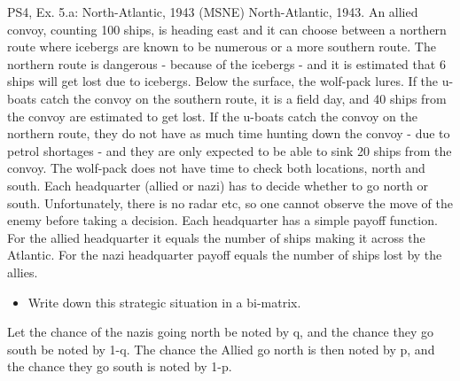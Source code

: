 \begin{frame}{PS4, Ex. 5.a: North-Atlantic, 1943 (MSNE)}
      North-Atlantic, 1943. An allied convoy, counting 100 ships, is heading east and it can choose between a northern route where icebergs are known to be numerous or a more southern route. The northern route is dangerous - because of the icebergs - and it is estimated that 6 ships will get lost due to icebergs. Below the surface, the wolf-pack lures. If the u-boats catch the convoy on the southern route, it is a field day, and 40 ships from the convoy are estimated to get lost. If the u-boats catch the convoy on the northern route, they do not have as much time hunting down the convoy - due to petrol shortages - and they are only expected to be able to sink 20 ships from the convoy. The wolf-pack does not have time to check both locations, north and south. Each headquarter (allied or nazi) has to decide whether to go north or south. Unfortunately, there is no radar etc, so one cannot observe the move of the enemy before taking a decision. Each headquarter has a simple payoff function. For the allied headquarter it equals the number of ships making it across the Atlantic. For the nazi headquarter payoff equals the number of ships lost by the allies.
    \begin{itemize}
      \item[(a)] Write down this strategic situation in a bi-matrix.
    \end{itemize}
    Let the chance of the nazis going north be noted by q, and the chance they go south be noted by 1-q. The chance the Allied go north is then noted by p, and the chance they go south is noted by 1-p.
  \vfill\null
\end{frame}
